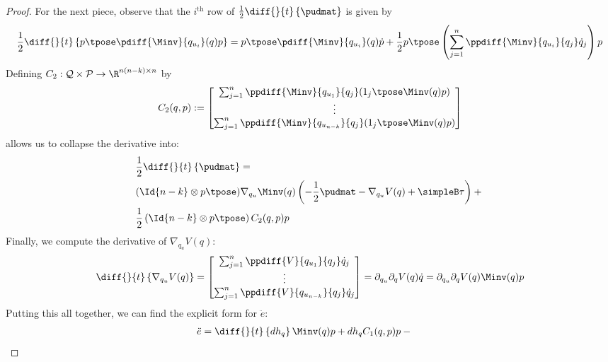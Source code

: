\begin{proof}
    For the next piece, observe that the \(i^\text{th}\) row of
    \(\frac{1}{2} \diff{}{t} \left\{ \pudmat \right\}\)
    is given by
    \begin{align*}
        \frac{1}{2} \diff{}{t}\left\{p\tpose \pdiff{\Minv}{q_{u_i}}(q)p\right\}
        = p\tpose \pdiff{\Minv}{q_{u_i}}(q) \dot{p} + 
        \frac{1}{2} p\tpose \left( \sum_{j=1}^n \ppdiff{\Minv}{q_{u_i}}{q_j}
        \dot{q}_j \right) p
    \end{align*}
    Defining \(C_2 : \mathcal{Q} \times \mathcal{P} \rightarrow \R^{n(n-k)\times n}\) 
    by
    \begin{equation}
        C_2(q,p) := \begin{bmatrix}
            \sum_{j=1}^n \ppdiff{\Minv}{q_{u_1}}{q_j} (1_j\tpose \Minv(q)p) \\
            \vdots \\
            \sum_{j=1}^n \ppdiff{\Minv}{q_{u_{n-k}}}{q_j} (1_j\tpose \Minv(q)p) \\
        \end{bmatrix}
    \end{equation}
    allows us to collapse the derivative into:
    \begin{align}
        & \frac{1}{2} \diff{}{t} \left\{ \pudmat \right\} ={} 
        \nonumber \\
        & (\Id{n-k} \otimes p\tpose)\nabla_{q_u}\Minv(q)
        \left(-\frac{1}{2}\pudmat - \nabla_{q_u}V(q) + \simpleB \tau \right) +{}
        \nonumber \\
        & \frac{1}{2}\left(\Id{n-k}\otimes p\tpose\right) C_2(q,p) p
    \end{align}
    Finally, we compute the derivative of \(\nabla_{q_u}V(q)\):
    \begin{equation}
        \diff{}{t}\left\{\nabla_{q_u}V(q)\right\} = 
        \begin{bmatrix}
            \sum_{j=1}^n \ppdiff{V}{q_{u_1}}{q_j}\dot{q}_j \\
            \vdots \\
            \sum_{j=1}^n \ppdiff{V}{q_{u_{n-k}}}{q_j}\dot{q}_j
        \end{bmatrix} = \partial_{q_u} \partial_q V(q) \dot{q} 
        = \partial_{q_u} \partial_q V(q) \Minv(q)p
    \end{equation}
    Putting this all together, we can find the explicit form for \(\ddot{e}\):
    \begin{align}
        \ddot{e} &= \diff{}{t}\left\{dh_q\right\}\Minv(q)p + dh_q C_1(q,p)p -{}

\end{align}
\end{proof}
